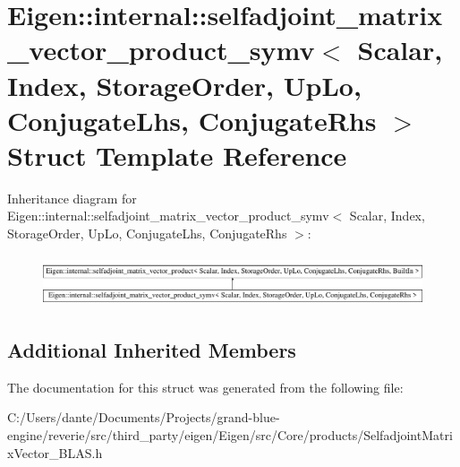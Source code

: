 \hypertarget{struct_eigen_1_1internal_1_1selfadjoint__matrix__vector__product__symv}{}\section{Eigen\+::internal\+::selfadjoint\+\_\+matrix\+\_\+vector\+\_\+product\+\_\+symv$<$ Scalar, Index, Storage\+Order, Up\+Lo, Conjugate\+Lhs, Conjugate\+Rhs $>$ Struct Template Reference}
\label{struct_eigen_1_1internal_1_1selfadjoint__matrix__vector__product__symv}
Inheritance diagram for Eigen\+::internal\+::selfadjoint\+\_\+matrix\+\_\+vector\+\_\+product\+\_\+symv$<$ Scalar, Index, Storage\+Order, Up\+Lo, Conjugate\+Lhs, Conjugate\+Rhs $>$\+:\begin{figure}[H]
\begin{center}
\leavevmode
\includegraphics[height=1.519674cm]{struct_eigen_1_1internal_1_1selfadjoint__matrix__vector__product__symv}
\end{center}
\end{figure}
\subsection*{Additional Inherited Members}


The documentation for this struct was generated from the following file\+:\begin{DoxyCompactItemize}
\item 
C\+:/\+Users/dante/\+Documents/\+Projects/grand-\/blue-\/engine/reverie/src/third\+\_\+party/eigen/\+Eigen/src/\+Core/products/Selfadjoint\+Matrix\+Vector\+\_\+\+B\+L\+A\+S.\+h\end{DoxyCompactItemize}
